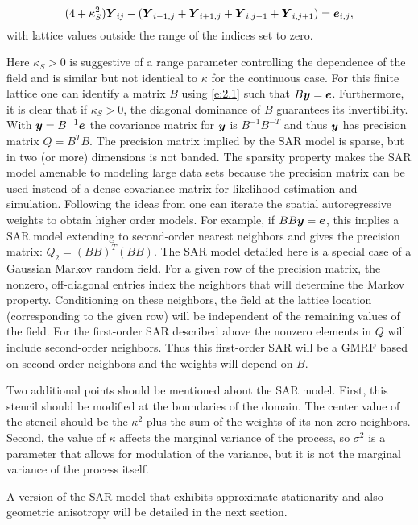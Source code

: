 \documentclass[review]{elsarticle}
\begin{document}
\begin{equation}
\label{e:2.1}
 (4+\kappa_{S}^2) \mbox{\boldmath $Y$}_{ij} - ( \mbox{\boldmath $Y$}_{i-1,j} + \mbox{\boldmath $Y$}_{i+1,j} + \mbox{\boldmath $Y$}_{i,j-1} + \mbox{\boldmath $Y$}_{i,j+1} ) =  \mbox{\boldmath $e$}_{i,j},
 \end{equation} 
with lattice values outside the range of the indices set to zero. 

Here $\kappa_{S}> 0 $ is suggestive of a range parameter controlling the dependence of the field and is similar but not identical to $\kappa$ for 
the continuous case. For this finite lattice one can identify a matrix $B$ using \ref{e:2.1} such that $B\mbox{\boldmath $y$} =  \mbox{\boldmath $e$}$. Furthermore, it is clear that if $\kappa_{S}> 0$, the diagonal dominance of $B$ guarantees its invertibility. 
 With $\mbox{\boldmath $y$}  =   B^{-1} \mbox{\boldmath $e$}$  the covariance matrix for $\mbox{\boldmath $y$}$ is $ B^{-1}B^{-T}$ and thus $\mbox{\boldmath $y$}$ has precision matrix $Q= B^T B $.  The precision matrix implied by the SAR model is sparse, but in two (or more) dimensions is not banded. The sparsity property makes the SAR model amenable to modeling large data sets because the precision matrix can be used instead of a dense covariance matrix for likelihood estimation and simulation.  Following the ideas from \cite{lindgren2011explicit} one can iterate the spatial autoregressive weights to obtain higher order models. For example, if $ B B \mbox{\boldmath $y$} = \mbox{\boldmath $e$} $, this implies a SAR model extending to second-order nearest neighbors and gives the precision matrix: $Q_2= (B B)^T (B B)$.   The SAR model detailed here is a special case of a Gaussian Markov random field. For a given row of the precision matrix, the nonzero, off-diagonal entries index the neighbors that will determine the Markov property. Conditioning on these neighbors, the field at the lattice location (corresponding to the given row) will be independent of the remaining values of the field. For the first-order SAR described above the nonzero elements in $Q$ will include second-order neighbors. Thus this first-order SAR will be a GMRF based on second-order neighbors and the weights will depend on $B$. 

Two additional points  should be mentioned about the SAR model. First, this stencil should be modified at the boundaries of the domain. The center value of the stencil should be the $\kappa^2$ plus the sum of the weights of its non-zero neighbors. Second, the value of $\kappa$ affects the marginal variance of the process, so $\sigma^2$ is a parameter that allows for modulation of the variance, but it is not the marginal variance of the process itself. 

A version of the SAR model that exhibits approximate stationarity and also geometric anisotropy will be detailed in the next section. 
 
\end{document}

